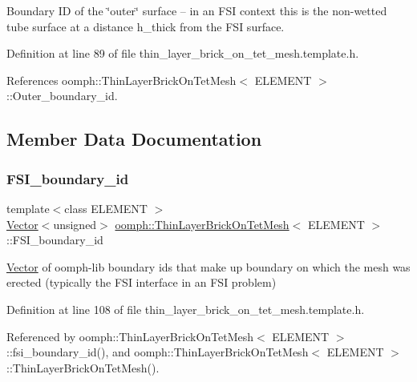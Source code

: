 Boundary ID of the \char`\"{}outer\char`\"{} surface -- in an F\+SI context this is the non-\/wetted tube surface at a distance h\+\_\+thick from the F\+SI surface. 



Definition at line 89 of file thin\+\_\+layer\+\_\+brick\+\_\+on\+\_\+tet\+\_\+mesh.\+template.\+h.



References oomph\+::\+Thin\+Layer\+Brick\+On\+Tet\+Mesh$<$ E\+L\+E\+M\+E\+N\+T $>$\+::\+Outer\+\_\+boundary\+\_\+id.



\subsection{Member Data Documentation}
\mbox{\label{classoomph_1_1ThinLayerBrickOnTetMesh_ad2b0a664fa1fc0f6f530740e40591212}} 
\subsubsection{\texorpdfstring{F\+S\+I\+\_\+boundary\+\_\+id}{FSI\_boundary\_id}}
{\footnotesize\ttfamily template$<$class E\+L\+E\+M\+E\+NT $>$ \\
\hyperlink{classoomph_1_1Vector}{Vector}$<$unsigned$>$ \hyperlink{classoomph_1_1ThinLayerBrickOnTetMesh}{oomph\+::\+Thin\+Layer\+Brick\+On\+Tet\+Mesh}$<$ E\+L\+E\+M\+E\+NT $>$\+::F\+S\+I\+\_\+boundary\+\_\+id\hspace{0.3cm}{\ttfamily [private]}}



\hyperlink{classoomph_1_1Vector}{Vector} of oomph-\/lib boundary ids that make up boundary on which the mesh was erected (typically the F\+SI interface in an F\+SI problem) 



Definition at line 108 of file thin\+\_\+layer\+\_\+brick\+\_\+on\+\_\+tet\+\_\+mesh.\+template.\+h.



Referenced by oomph\+::\+Thin\+Layer\+Brick\+On\+Tet\+Mesh$<$ E\+L\+E\+M\+E\+N\+T $>$\+::fsi\+\_\+boundary\+\_\+id(), and oomph\+::\+Thin\+Layer\+Brick\+On\+Tet\+Mesh$<$ E\+L\+E\+M\+E\+N\+T $>$\+::\+Thin\+Layer\+Brick\+On\+Tet\+Mesh().

